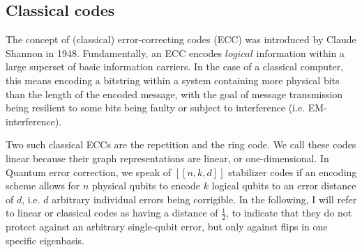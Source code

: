 \subsection{Classical codes}
The concept of (classical) error-correcting codes (ECC) was
introduced by Claude Shannon in 1948.
Fundamentally, an ECC encodes $logical$ information within
a large superset of basic information carriers.
In the case of a classical computer, this means encoding a
bitstring within a system containing more physical bits
than the length of the encoded message, with the goal of message transmission
being resilient to some bits being faulty or subject to interference (i.e. EM-interference).

Two such classical ECCs are the repetition and the ring code.
We call these codes linear because their graph representations are
linear, or one-dimensional. In Quantum error correction, we speak of $[[n,k,d]]$ stabilizer
codes if an encoding scheme allows for $n$ physical qubits to 
encode $k$ logical qubits to an error distance of $d$, i.e. $d$ 
arbitrary individual errors being corrigible.
In the following, I will refer to linear or classical codes as having a 
distance of $\frac{1}{2}$, to indicate that they do not protect against an
arbitrary single-qubit error, but only against flips in one specific eigenbasis.

\newpage

